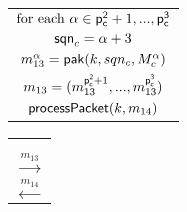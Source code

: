 \begin{figure*}[!htp]
\begin{center}
\begin{enumerate}
{\begin{minipage}[t]{0.38\textwidth}
  \centering
   \begin{tabular}{c}
    $\text{for each } \alpha \in {\ensuremath{\mathsf{p_c^{2}}}+1,...,\ensuremath{\mathsf{p_c^{3}}}}$ \\
    $\mathsf{sqn}_c = \alpha + 3$ \\
    $m_{13}^{\alpha} = \mathsf{pak}(k, sqn_c, M_c^{\alpha})$ \\
    $m_{13} = (m_{13}^{\mathsf{p_c^{2}}+1},...,m_{13}^{\mathsf{p_c^{3}}})$ \\
    $\mathsf{processPacket}(k, m_{14})$ \\
   \end{tabular}
  \end{minipage}%
 }
 \begin{minipage}[t]{0.13\textwidth}
  \centering
  \begin{tabular}{c}
   $ $ \\
   $ $ \\
   $\xrightarrow{m_{13}}$ \\
   $\xleftarrow{m_{14}}$ \\
  \end{tabular}
 \end{minipage}%
\end{enumerate}

 \end{center}
\end{figure*}